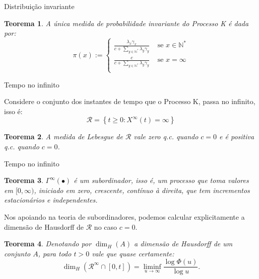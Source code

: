 \documentclass[xcolor=pdftex,dvipsnames]{beamer}
\newcommand{\RR}{{\mathcal{R}}}
\newcommand{\Nz}{{\mathbb{N^*}}}
\newcommand{\qc}{{\emph{q.c.}} }
\newtheorem{teorema}{Teorema}
\begin{document}
\begin{frame}{Distribuição invariante}
  \begin{teorema}
    A única medida de probabilidade invariante do Processo K é dada
    por:
    \begin{displaymath}
      \pi(x) := \begin{cases}
        \frac{\lambda_x \gamma_x}{c + \sum_{y \in \Nz} \lambda_y \gamma_y}
        & \textrm{ se } x \in \Nz \\
        \frac{c}{c + \sum_{y \in \Nz} \lambda_y \gamma_y}
        & \textrm{ se } x = \infty \\
      \end{cases}
    \end{displaymath}
  \end{teorema}
\end{frame}


\begin{frame}{Tempo no infinito}

  Considere o conjunto dos instantes de tempo que o Processo K, passa
  no infinito, isso é:
  \begin{displaymath}
    \RR = \left\{ t \geq 0: X^\infty(t) = \infty \right\}
  \end{displaymath}
  \pause
  \begin{teorema}
    A medida de Lebesgue de $\RR$ vale zero \qc quando $c = 0$ e é
    positiva \qc quando $c = 0$.
  \end{teorema}
\end{frame}

\begin{frame}{Tempo no infinito}

  \begin{teorema}
    $\Gamma^\infty(\bullet)$ é um subordinador, isso é, um processo
    que toma valores em $[0, \infty)$, iniciado em zero, crescente,
    contínuo à direita, que tem incrementos estacionários e
    independentes.
  \end{teorema}
  \pause
  Nos apoiando na teoria de subordinadores, podemos calcular
  explicitamente a dimensão de Hausdorff de $\RR$ no caso $c=0$.
  \begin{teorema}
    Denotando por $\dim_H (A)$ a dimensão de Hausdorff de um conjunto
    $A$, para todo $t > 0$ vale que quase certamente:
    \begin{displaymath}
      \dim_H(\RR^\infty \cap [0, t]) = 
      \liminf_{u \to \infty} \frac{\log \Phi(u)}{\log u}.
    \end{displaymath}
  \end{teorema}
\end{frame}
\end{document}
